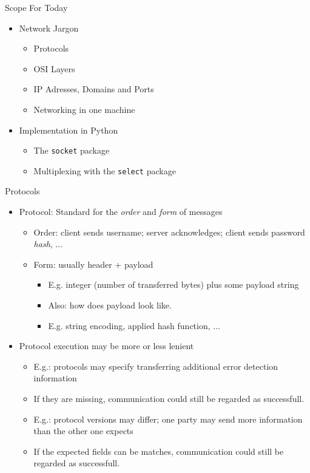 \begin{frame}{Scope For Today}
%
\begin{itemize}
\item Network Jargon
	\begin{itemize}
	\item Protocols
	\item OSI Layers
	\item IP Adresses, Domains and Ports
	\item Networking in one machine
	\end{itemize}
\item Implementation in Python
	\begin{itemize}
	\item The \texttt{socket} package
	\item Multiplexing with the \texttt{select} package 
	\end{itemize}
\end{itemize}
%
\end{frame}


\begin{frame}{Protocols}
%
\begin{itemize}
\item Protocol: Standard for the \emph{order} and \emph{form} of messages
	\begin{itemize}
	\item Order: client sends username; server acknowledges; client sends password \emph{hash}, ...
	\item Form: usually header + payload
		\begin{itemize}
		\item E.\;g. integer (number of transferred bytes) plus some payload string
		\item Also: how does payload look like.
		\item E.\;g. string encoding, applied hash function, ...
		\end{itemize}
	\end{itemize}
\pause
\item Protocol execution may be more or less lenient
	\begin{itemize}
	\item E.\;g.: protocols may specify transferring additional error detection information
	\item If they are missing, communication could still be regarded as successfull.
	\item E.\;g.: protocol versions may differ; one party may send more information than the other one expects
	\item If the expected fields can be matches, communication could still be regarded as successfull.
	\end{itemize}
\end{itemize}
%
\end{frame}

